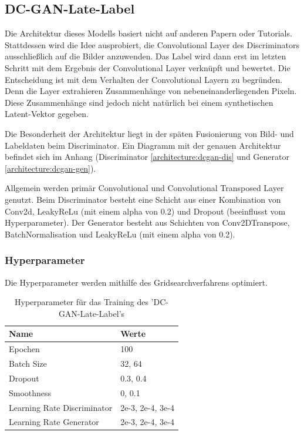 \subsection{DC-GAN-Late-Label}
\label{section:dc-gan-late-label}
Die Architektur dieses Modells basiert nicht auf anderen Papern oder Tutorials.
Stattdessen wird die Idee ausprobiert, die Convolutional Layer des Discriminators ausschließlich auf die Bilder anzuwenden.
Das Label wird dann erst im letzten Schritt mit dem Ergebnis der Convolutional Layer verknüpft und bewertet.
Die Entscheidung ist mit dem Verhalten der Convolutional Layern zu begründen.
Denn die Layer extrahieren Zusammenhänge von nebeneinanderliegenden Pixeln.
Diese Zusammenhänge sind jedoch nicht natürlich bei einem synthetischen Latent-Vektor gegeben.

Die Besonderheit der Architektur liegt in der späten Fusionierung von Bild- und Labeldaten beim Discriminator.
Ein Diagramm mit der genauen Architektur befindet sich im Anhang (Discriminator \cref{architecture:dcgan-dis} und Generator \cref{architecture:dcgan-gen}).

Allgemein werden primär Convolutional und Convolutional Transposed Layer genutzt.
Beim Discriminator besteht eine Schicht aus einer Kombination von Conv2d, LeakyReLu (mit einem alpha von 0.2) und Dropout (beeinflusst vom Hyperparameter).
Der Generator besteht aus Schichten von Conv2DTranspose, BatchNormalisation und LeakyReLu (mit einem alpha von 0.2).

\subsubsection{Hyperparameter}
Die Hyperparameter werden mithilfe des Gridsearchverfahrens optimiert.
\begin{table}[H]
	\centering
	\begin{tabular}{l l}
		Name                        & Werte            \\ \hline
		Epochen                     & 100              \\
		Batch Size                  & 32, 64            \\
		Dropout                     & 0.3, 0.4         \\
		Smoothness                  & 0, 0.1           \\
		Learning Rate Discriminator & 2e-3, 2e-4, 3e-4 \\
		Learning Rate Generator     & 2e-3, 2e-4, 3e-4
	\end{tabular}
	\caption{Hyperparameter für das Training des 'DC-GAN-Late-Label's}
\end{table}


